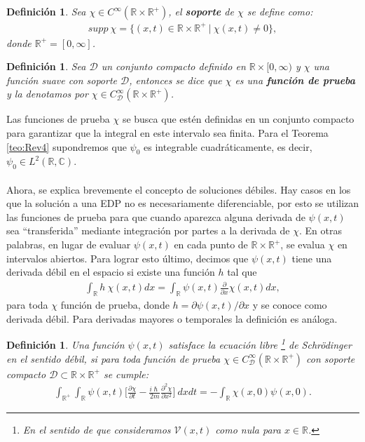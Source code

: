 \documentclass[12pt]{article}
\newtheorem{defn}[teo]{Definición}
\theoremstyle{definition}
\newcommand*{\field}[1]{\mathbb{#1}}
\begin{document}
\begin{defn}
    Sea $\chi \in C^{\infty}(\field{R}\times\field{R}^{+})$, el \textbf{soporte} de $\chi$ se define como:
    \begin{align*}
        supp \: \chi = \{(x,t) \in \field{R}\times\field{R}^{+}\:|\: \chi(x,t) \neq 0 \},
    \end{align*}
    donde $\field{R}^+ = [0,\infty]$.
    \label{eq:Soporte}
\end{defn}
\begin{defn}
    Sea $\mathcal{D}$ un conjunto compacto definido en $\field{R}\times[0,\infty)$
    y $\chi$ una función suave con soporte $\mathcal{D}$, entonces se dice que $\chi$ es una \textbf{función de prueba} y la denotamos por $\chi \in C_{\mathcal{D}}^{\infty}(\field{R}\times\field{R}^{+})$.
    \label{eq:TestFunc}
\end{defn}
\noindent
Las funciones de prueba $\chi$ se busca que estén definidas en un conjunto compacto para garantizar que la integral en este intervalo sea finita. Para el Teorema \ref{teo:Rev4} supondremos que $\psi_{0}$ es integrable cuadráticamente, es decir,  $\psi_{0}\in L^{2}(\field{R},\field{C})$.\\ \\
Ahora, se explica brevemente el concepto de soluciones débiles.
 Hay casos en los que la solución a una EDP no es necesariamente diferenciable, por esto se utilizan las funciones de prueba para que cuando aparezca alguna derivada de $\psi(x,t)$ sea ``transferida'' mediante integración por partes a la derivada de $\chi$. En otras palabras, en lugar de evaluar $\psi(x,t)$ en cada punto de $\field{R}\times\field{R}^{+}$, se evalua $\chi$ en intervalos abiertos. Para lograr esto último, decimos que $\psi(x,t)$ tiene una derivada débil en el espacio si existe una función $h$ tal que
\begin{align*}
    \int_{\field{R}}h\:\chi(x,t) dx = \int_{\field{R}}\psi(x,t)\frac{\partial}{\partial x}\chi(x,t) dx,
\end{align*}
para toda $\chi$ función de prueba, donde $h = \partial\psi(x,t) / \partial x$ y se conoce como derivada débil. Para derivadas mayores o temporales la definición es análoga.
\begin{defn}
        Una función $\psi(x,t)$ satisface la ecuación libre \footnote{En el sentido de que consideramos $\mathcal{V}(x,t)$ como nula para $x\in\field{R}$.}  de Schrödinger en el sentido débil, si para toda función de prueba $\chi \in C_{\mathcal{D}}^{\infty}(\field{R}\times\field{R}^{+})$ con soporte compacto $\mathcal{D}\subset \field{R}\times\field{R}^{+}$ se cumple:
        \begin{align} \int_{\field{R}^+}\int_{\field{R}}\psi(x,t)\bigg[\frac{\partial\chi}{\partial t}-\frac{i\hslash}{2m}\frac{\partial ^2\chi}{\partial x^2}\bigg]\:dxdt = -\int_{\field{R}}\chi(x,0)\psi(x,0). \label{eq:Soldebil}
        \end{align}
        \label{lem:Rev5}
\end{defn}
\end{document}
